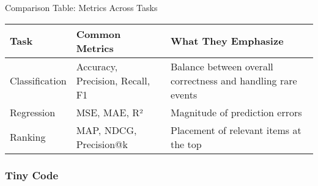 \documentclass[
  letterpaper,
  DIV=11,
  numbers=noendperiod]{scrreprt}
\begin{document}
Comparison Table: Metrics Across Tasks

\begin{longtable}[]{@{}
  >{\raggedright\arraybackslash}p{}
  >{\raggedright\arraybackslash}p{}
  >{\raggedright\arraybackslash}p{}@{}}
\toprule\noalign{}
\begin{minipage}[b]{\linewidth}\raggedright
Task
\end{minipage} & \begin{minipage}[b]{\linewidth}\raggedright
Common Metrics
\end{minipage} & \begin{minipage}[b]{\linewidth}\raggedright
What They Emphasize
\end{minipage} \\
\midrule\noalign{}
\endhead
\bottomrule\noalign{}
\endlastfoot
Classification & Accuracy, Precision, Recall, F1 & Balance between
overall correctness and handling rare events \\
Regression & MSE, MAE, R² & Magnitude of prediction errors \\
Ranking & MAP, NDCG, Precision@k & Placement of relevant items at the
top \\
\end{longtable}

\subsubsection{Tiny Code}\label{tiny-code-82}
\end{document}
